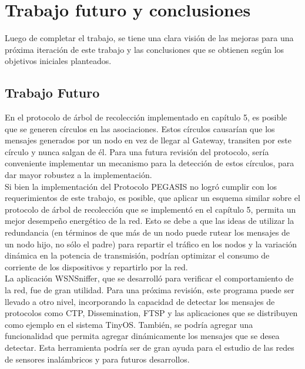 \chapter{Trabajo futuro y conclusiones}

Luego de completar el trabajo, se tiene una clara visión de las mejoras para una próxima iteración de este trabajo y las conclusiones que se obtienen según los objetivos iniciales planteados.
\section{Trabajo Futuro}

En el protocolo de árbol de recolección implementado en capítulo 5, es posible que se generen círculos en las asociaciones. Estos círculos causarían que los mensajes generados por un nodo en vez de llegar al Gateway, transiten por este círculo y nunca salgan de él. Para una futura revisión del protocolo, sería conveniente implementar un mecanismo para la detección de estos círculos, para dar mayor robustez a la implementación.\\

Si bien la implementación del Protocolo PEGASIS no logró cumplir con los requerimientos de este trabajo, es posible, que aplicar un esquema similar sobre el protocolo de árbol de recolección que se implementó en el capítulo 5, permita un mejor desempeño energético de la red. Esto se debe a que las ideas de utilizar la redundancia (en términos de que más de un nodo puede rutear los mensajes de un nodo hijo, no sólo el padre) para repartir el tráfico en los nodos y la variación dinámica en la potencia de transmisión, podrían optimizar el consumo de corriente de los dispositivos y repartirlo por la red.\\

La aplicación WSNSniffer, que se desarrolló para verificar el comportamiento de la red, fue de gran utilidad. Para una próxima revisión, este programa puede ser llevado a otro nivel, incorporando la capacidad de detectar los mensajes de protocolos como CTP, Dissemination, FTSP y las aplicaciones que se distribuyen como ejemplo en el sistema TinyOS. También, se podría agregar una funcionalidad que permita agregar dinámicamente los mensajes que se desea detectar. Esta herramienta podría ser de gran ayuda para el estudio de las redes de sensores inalámbricos y para futuros desarrollos.



